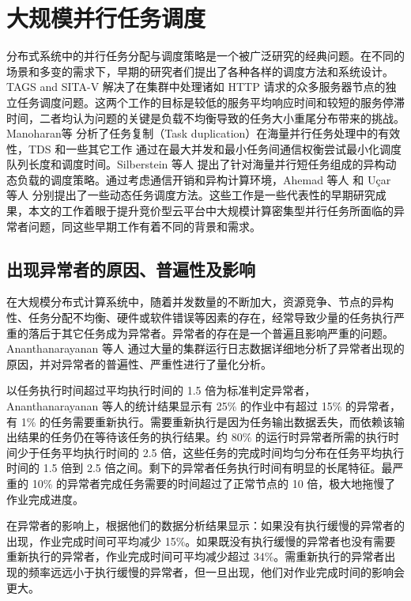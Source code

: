 \section{大规模并行任务调度}
分布式系统中的并行任务分配与调度策略是一个被广泛研究的经典问题。在不同的场景和多变的需求下，早期的研究者们提出了各种各样的调度方法和系统设计。TAGS \cite{balter} and SITA-V
\cite{Crovella:1998:TAD:277851.277942} 解决了在集群中处理诸如 HTTP 请求的众多服务器节点的独立任务调度问题。这两个工作的目标是较低的服务平均响应时间和较短的服务停滞时间，二者均认为问题的关键是负载不均衡导致的任务大小重尾分布带来的挑战。Manoharan等 \cite{Manoharan:2001:ETD:373047.373064} 分析了任务复制（Task duplication）在海量并行任务处理中的有效性，TDS \cite{rohtua} 和一些其它工作 \cite{ahmad, Dogan:2002:LDB:850943.853100} 通过在最大并发和最小任务间通信权衡尝试最小化调度队列长度和调度时间。Silberstein 等人 \cite{silberstein} 提出了针对海量并行短任务组成的异构动态负载的调度策略。通过考虑通信开销和异构计算环境，Ahemad 等人 \cite{Ahmad:1991:SLB:126283.126284} 和 Uçar 等人 \cite{ucar} 分别提出了一些动态任务调度方法。这些工作是一些代表性的早期研究成果，本文的工作着眼于提升竞价型云平台中大规模计算密集型并行任务所面临的异常者问题，同这些早期工作有着不同的背景和需求。

\subsection{出现异常者的原因、普遍性及影响}
在大规模分布式计算系统中，随着并发数量的不断加大，资源竞争、节点的异构性、任务分配不均衡、硬件或软件错误等因素的存在，经常导致少量的任务执行严重的落后于其它任务成为异常者。异常者的存在是一个普遍且影响严重的问题。Ananthanarayanan 等人 \cite{Ananthanarayanan:2010:ROM:1924943.1924962} 通过大量的集群运行日志数据详细地分析了异常者出现的原因，并对异常者的普遍性、严重性进行了量化分析。

以任务执行时间超过平均执行时间的 1.5 倍为标准判定异常者，Ananthanarayanan 等人的统计结果显示有 25\% 的作业中有超过 15\% 的异常者，有 1\% 的任务需要重新执行。需要重新执行是因为任务输出数据丢失，而依赖该输出结果的任务仍在等待该任务的执行结果。约 80\% 的运行时异常者所需的执行时间少于任务平均执行时间的 2.5 倍，这些任务的完成时间均匀分布在任务平均执行时间的 1.5 倍到 2.5 倍之间。剩下的异常者任务执行时间有明显的长尾特征。最严重的 10\% 的异常者完成任务需要的时间超过了正常节点的 10 倍，极大地拖慢了作业完成进度。

在异常者的影响上，根据他们的数据分析结果显示：如果没有执行缓慢的异常者的出现，作业完成时间可平均减少 15\%。如果既没有执行缓慢的异常者也没有需要重新执行的异常者，作业完成时间可平均减少超过 34\%。需重新执行的异常者出现的频率远远小于执行缓慢的异常者，但一旦出现，他们对作业完成时间的影响会更大。

